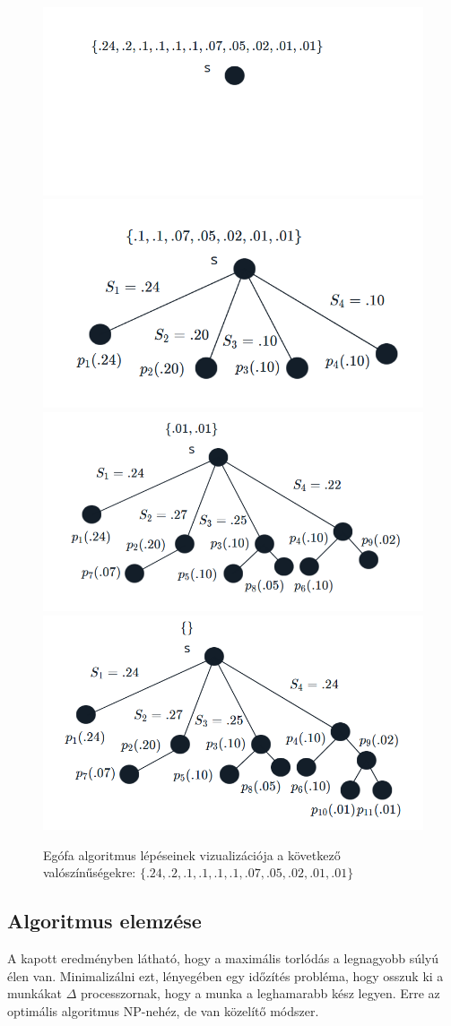 \documentclass[12pt]{report}
\begin{document}
\begin{figure}[H]
	\begin{center}
		\includegraphics[width=0.49\linewidth]{pictures/egofa1.png}
		\includegraphics[width=0.49\linewidth]{pictures/egofa2.png}
		\includegraphics[width=0.49\linewidth]{pictures/egofa3.png}
		\includegraphics[width=0.49\linewidth]{pictures/egofa4.png}
		\caption{Egófa algoritmus lépéseinek vizualizációja a következő valószínűségekre: 
			\( \{.24, .2, .1, .1, .1, .1, .07, .05, .02, .01, .01\}\)}
		\label{egotree-algorithm}
	\end{center}
\end{figure}


\subsection{Algoritmus elemzése}

A kapott eredményben látható, hogy a maximális torlódás a legnagyobb súlyú élen van.
Minimalizálni ezt, lényegében egy időzítés probléma, hogy osszuk ki a munkákat \(\Delta\) processzornak, hogy a munka a leghamarabb kész legyen.
Erre az optimális algoritmus NP-nehéz, de van közelítő módszer.
\end{document}
